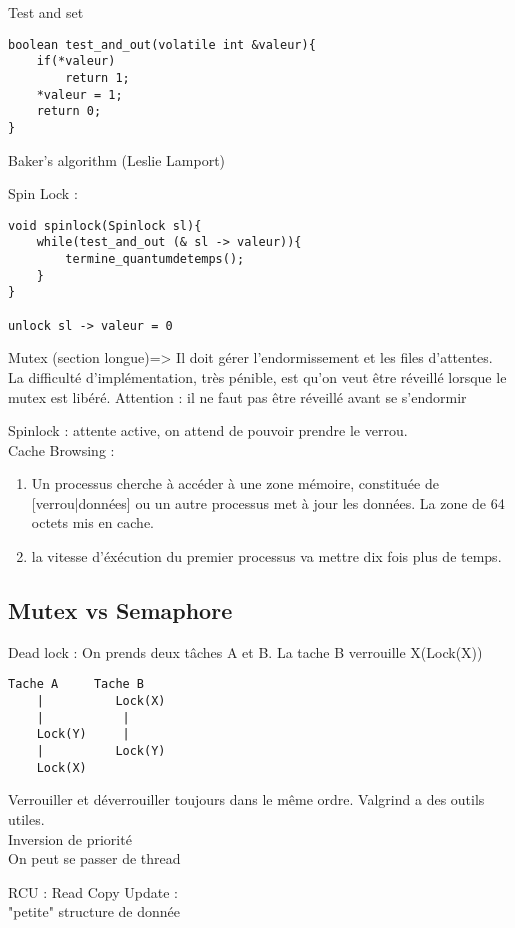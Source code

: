 \documentclass{article}
\begin{document}
Test and set
\begin{verbatim}
boolean test_and_out(volatile int &valeur){
	if(*valeur)
		return 1;
	*valeur = 1;
	return 0;
}
\end{verbatim}

Baker's algorithm (Leslie Lamport)

Spin Lock :\\
\begin{verbatim}
void spinlock(Spinlock sl){
	while(test_and_out (& sl -> valeur)){
		termine_quantumdetemps();
	}
}

unlock sl -> valeur = 0
\end{verbatim}

Mutex (section longue)=> Il doit gérer l'endormissement et les files d'attentes.\\
La difficulté d'implémentation, très pénible, est qu'on veut être réveillé lorsque le mutex est libéré. Attention : il ne faut pas être réveillé avant se s'endormir


\vskip 3cm
Spinlock : attente active, on attend de pouvoir prendre le verrou.\\

Cache Browsing : 
\begin{enumerate}
	\item Un processus cherche à accéder à une zone mémoire, constituée de [verrou|données] ou un autre processus met à jour les données. La zone de 64 octets mis en cache. 
	\item la vitesse d'éxécution du premier processus va mettre dix fois plus de temps.
\end{enumerate}

\subsection{Mutex vs Semaphore}
Dead lock : On prends deux tâches A et B. La tache B verrouille X(Lock(X))
\begin{verbatim}
Tache A		Tache B
	|		   Lock(X)
	|			|
	Lock(Y)		|
	|		   Lock(Y)
	Lock(X)
\end{verbatim}

Verrouiller et déverrouiller toujours dans le même ordre.
Valgrind a des outils utiles.\\

Inversion de priorité\\
On peut se passer de thread

\vskip 1cm
RCU : Read Copy Update :\\
"petite" structure de donnée
\end{document}
